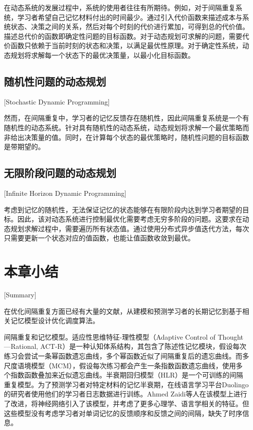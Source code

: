 在动态系统的发展过程中，系统的使用者往往有所期待。例如，对于间隔重复系统，学习者希望自己记忆材料付出的时间最少。通过引入代价函数来描述成本与系统状态、决策之间的关系，然后对每个时刻的代价进行累加，可得到总的代价值。描述总代价的函数即确定性问题的目标函数。对于动态规划可求解的问题，需要代价函数只依赖于当前时刻的状态和决策，以满足最优性原理。对于确定性系统，动态规划将求解每一个状态下的最优决策量，以最小化目标函数。

\subsection{随机性问题的动态规划}[Stochastic Dynamic Programming]

然而，在间隔重复中，学习者的记忆反馈存在随机性，因此间隔重复系统是一个有随机性的动态系统。针对具有随机性的动态系统，动态规划将求解一个最优策略而非给出决策量的值。同时，在计算每个状态的最优策略时，随机性问题的目标函数是带期望的\cite[14-16]{bertsekasReinforcementLearningOptimal2019}。

\subsection{无限阶段问题的动态规划}[Infinite Horizon Dynamic Programming]

考虑到记忆的随机性，无法保证记忆的状态能够在有限阶段内达到学习者期望的目标。因此，该对动态系统进行控制最优化需要考虑无穷多阶段的问题。这要求在动态规划求解过程中，需要遍历所有状态值。通过使用分布式异步值迭代方法，每次只需要更新一个状态对应的值函数，也能让值函数收敛到最优\cite[197-200]{bertsekasReinforcementLearningOptimal2019}。

\section{本章小结}[Summary]

在优化间隔重复方面已经有大量的文献，从建模和预测学习者的长期记忆到基于相关记忆模型设计优化调度算法。

间隔重复和记忆模型。适应性思维特征-理性模型（Adaptive Control of Thought—Rational, ACT-R）\cite{andersonIntegratedTheoryMind2004}是一种认知体系结构，其包含了陈述性记忆模块，假设每次练习会尝试一条幂函数遗忘曲线，多个幂函数近似了间隔重复后的遗忘曲线。而多尺度语境模型（MCM）\cite{pashlerPredictingOptimalSpacing2009}，假设每次练习都会产生一条指数函数遗忘曲线，使用多个指数函数叠加来近似遗忘曲线。半衰期回归模型（HLR）\cite{settlesTrainableSpacedRepetition2016}是一个可训练的间隔重复模型。为了预测学习者对特定材料的记忆半衰期，在线语言学习平台Duolingo的研究者使用他们的学习者日志数据进行训练。Ahmed Zaidi等人\cite{zaidiAdaptiveForgettingCurves2020}在该模型上进行了改进，将神经网络引入了该模型，并考虑了更多心理学、语言学相关的特征。但这些模型没有考虑学习者对单词记忆的反馈顺序和反馈之间的间隔，缺失了时序信息。

